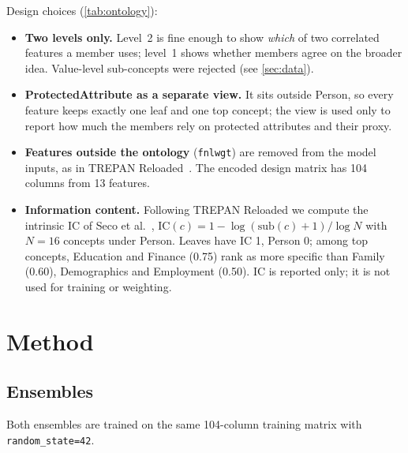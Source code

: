 \documentclass[11pt,a4paper]{article}
\newcommand{\code}[1]{\texttt{#1}}
\newcommand{\concept}[1]{\textsf{#1}}
\begin{document}
Design choices (\cref{tab:ontology}):
\begin{itemize}
  \item \textbf{Two levels only.} Level~2 is fine enough to show \emph{which} of two correlated features a member
    uses; level~1 shows whether members agree on the broader idea. Value-level sub-concepts were rejected (see
    \cref{sec:data}).
  \item \textbf{\concept{ProtectedAttribute} as a separate view.} It sits outside \concept{Person}, so every
    feature keeps exactly one leaf and one top concept; the view is used only to report how much the members rely
    on protected attributes and their proxy.
  \item \textbf{Features outside the ontology} (\code{fnlwgt}) are removed from the model inputs, as in TREPAN
    Reloaded~\cite{confalonieri2021trepan}. The encoded design matrix has 104 columns from 13 features.
  \item \textbf{Information content.} Following TREPAN Reloaded we compute the intrinsic IC of Seco et
    al.~\cite{seco2004ic}, $\mathrm{IC}(c) = 1 - \log(\mathrm{sub}(c)+1)/\log N$ with $N = 16$ concepts under
    \concept{Person}. Leaves have IC 1, \concept{Person} 0; among top concepts, \concept{Education} and
    \concept{Finance} (0.75) rank as more specific than \concept{Family} (0.60), \concept{Demographics} and
    \concept{Employment} (0.50). IC is reported only; it is not used for training or weighting.
\end{itemize}

\section{Method}\label{sec:method}

\subsection{Ensembles}
Both ensembles are trained on the same 104-column training matrix with \code{random\_state=42}.
\end{document}
